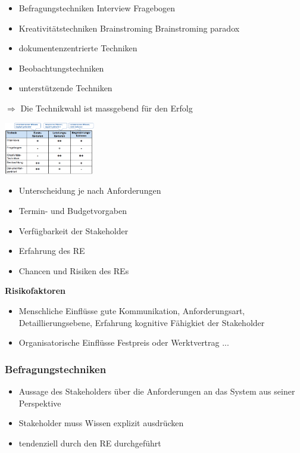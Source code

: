 \documentclass{report}
\newenvironment{Figure}
	{\par\medskip\noindent\minipage{\linewidth}}
	{\endminipage\par\medskip}
\theoremstyle{definition}
\theoremstyle{example}
\begin{document}
\begin{itemize}
   \item Befragungstechniken
   \subitem Interview
   \subitem Fragebogen 
   \item Kreativitätstechniken
   \subitem Brainstroming
   \subitem Brainstroming paradox
   \item dokumentenzentrierte Techniken
   \item Beobachtungstechniken
   \item unterstützende Techniken
\end{itemize}
$\Rightarrow$ Die Technikwahl ist massgebend für den Erfolg

\begin{Figure}
   \centering
    \includegraphics[width=150px]{img/ErmittlungstechnikenKanoModell.png}
        \label{fig:Zusammenhang Ermittlungstechniken mit dem Kano-Modell}
\end{Figure}

\begin{itemize}
   \item Unterscheidung je nach Anforderungen
   \item Termin- und Budgetvorgaben
   \item Verfügbarkeit der Stakeholder
   \item Erfahrung des RE
   \item Chancen und Risiken des REs
\end{itemize}

\textbf{Risikofaktoren}
\begin{itemize}
   \item Menschliche Einflüsse
   \subitem gute Kommunikation, Anforderungsart, Detaillierungsebene, Erfahrung
   \subitem kognitive Fähigkiet der Stakeholder
   \item Organisatorische Einflüsse
   \subitem Festpreis oder Werktvertrag
   \subitem ...
\end{itemize}

\subsubsection{Befragungstechniken}
\begin{itemize}
   \item Aussage des Stakeholders über die Anforderungen an das System aus seiner Perspektive
   \item Stakeholder muss Wissen explizit ausdrücken
   \item tendenziell durch den RE durchgeführt
\end{itemize}
\end{document}
